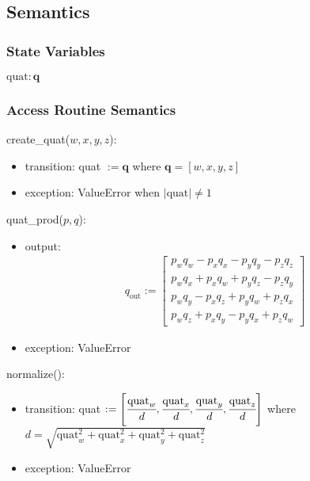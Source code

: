 \documentclass[12pt, titlepage]{article}
\begin{document}
\subsection{Semantics}

\subsubsection{State Variables}

$\text{quat}: \mathbf{q}$

\subsubsection{Access Routine Semantics}

\noindent create\_quat($w, x, y, z$):
\begin{itemize}
\item transition: quat $:= \mathbf{q}$ where $\mathbf{q} = [w, x, y, z]$
\item exception: ValueError when  $|\text{quat}| \neq 1$
\end{itemize}

\noindent quat\_prod($p, q$):
\begin{itemize}
\item output:
  \begin{align*}
    q_\text{out} :=  \begin{bmatrix}
      p_w q_w - p_x q_x - p_y q_y - p_z q_z \\
      p_w q_x + p_x q_w + p_y q_z - p_z q_y \\
      p_w q_y - p_x q_z + p_y q_w + p_z q_x \\
      p_w q_z + p_x q_y - p_y q_x + p_z q_w
  \end{bmatrix}
  \end{align*}

\item exception: ValueError
\end{itemize}

\noindent normalize():
\begin{itemize}
\item transition: quat $:= \left[ \cfrac{\text{quat}_w}{d}, \cfrac{\text{quat}_x}{d},
\cfrac{\text{quat}_y}{d}, \cfrac{\text{quat}_z}{d} \right]$ where $d = \sqrt{\text{quat}_w^2 +
\text{quat}_x^2 + \text{quat}_y^2 + \text{quat}_z^2}$
\item exception: ValueError
\end{itemize}
\end{document}
